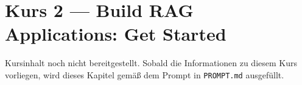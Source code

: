 \chapter{Kurs 2 --- Build RAG Applications: Get Started}

\begin{luecke}
Kursinhalt noch nicht bereitgestellt. Sobald die Informationen zu diesem Kurs vorliegen,
wird dieses Kapitel gemäß dem Prompt in \texttt{PROMPT.md} ausgefüllt.
\end{luecke}

